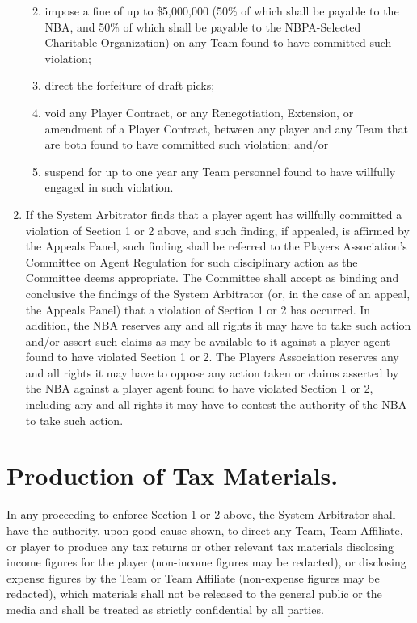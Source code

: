 \documentclass[
]{book}
\providecommand{\tightlist}{%
  \setlength{\itemsep}{0pt}\setlength{\parskip}{0pt}}
\begin{document}
\begin{enumerate}
  \begin{enumerate}
  \def\labelenumii{(\roman{enumii})}
  \tightlist
  \item
    impose a fine of up to \$5,000,000 (50\% of which shall be payable to the NBA, and 50\% of which shall be payable to the NBPA-Selected Charitable Organization) on any Team found to have committed such violation;
  \item
    direct the forfeiture of draft picks;
  \item
    void any Player Contract, or any Renegotiation, Extension, or amendment of a Player Contract, between any player and any Team that are both found to have committed such violation; and/or
  \item
    suspend for up to one year any Team personnel found to have willfully engaged in such violation.
  \end{enumerate}
\item
  If the System Arbitrator finds that a player agent has willfully committed a violation of Section 1 or 2 above, and such finding, if appealed, is affirmed by the Appeals Panel, such finding shall be referred to the Players Association's Committee on Agent Regulation for such disciplinary action as the Committee deems appropriate. The Committee shall accept as binding and conclusive the findings of the System Arbitrator (or, in the case of an appeal, the Appeals Panel) that a violation of Section 1 or 2 has occurred. In addition, the NBA reserves any and all rights it may have to take such action and/or assert such claims as may be available to it against a player agent found to have violated Section 1 or 2. The Players Association reserves any and all rights it may have to oppose any action taken or claims asserted by the NBA against a player agent found to have violated Section 1 or 2, including any and all rights it may have to contest the authority of the NBA to take such action.
\end{enumerate}

\hypertarget{production-of-tax-materials.}{%
\section{Production of Tax Materials.}\label{production-of-tax-materials.}}

In any proceeding to enforce Section 1 or 2 above, the System Arbitrator shall have the authority, upon good cause shown, to direct any Team, Team Affiliate, or player to produce any tax returns or other relevant tax materials disclosing income figures for the player (non-income figures may be redacted), or disclosing expense figures by the Team or Team Affiliate (non-expense figures may be redacted), which materials shall not be released to the general public or the media and shall be treated as strictly confidential by all parties.
\end{document}
